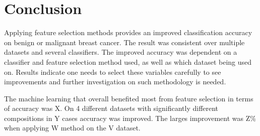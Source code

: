 \chapter{Conclusion}



Applying feature selection methods provides an improved classification accuracy on benign or malignant breast cancer. The result was consistent over multiple datasets and several classifiers. The improved accuracy was dependent on a classifier and feature selection method used, as well as which dataset being used on. Results indicate one needs to select these variables carefully to see improvements and further investigation on such methodology is needed.

The machine learning that overall benefited most from feature selection in terms of accuracy was X. On 4 different datasets with significantly different compositions in Y cases accuracy was improved. The larges improvement was Z\% when applying W method on the V dataset.


